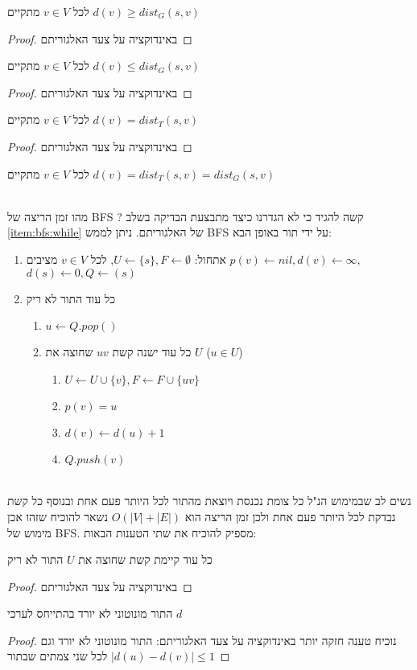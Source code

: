 \begin{claim}
לכל
$v \in V$
מתקיים
$d(v) \geq dist_G(s, v)$
\end{claim}
\begin{proof}
באינדוקציה על צעד האלגוריתם
\end{proof}

\begin{claim}
לכל
$v \in V$
מתקיים
$d(v) \leq dist_G(s,v)$
\end{claim}
\begin{proof}
באינדוקציה על צעד האלגוריתם
\end{proof}

\begin{claim}
לכל
$v \in V$
מתקיים
$d(v) = dist_T(s,v)$
\end{claim}
\begin{proof}
באינדוקציה על צעד האלגוריתם
\end{proof}


\begin{theorem}
לכל
$v \in V$
מתקיים
$d(v) = dist_T(s,v) = dist_G(s,v)$
\end{theorem}
\\
\noindent
מהו זמן הריצה של BFS ? קשה להגיד כי לא הגדרנו כיצד מתבצעת הבדיקה בשלב 
\ref{item:bfs:while}
של האלגוריתם. 
ניתן לממש BFS על ידי תור באופן הבא:
\begin{enumerate}
\item
אתחול:
$U \leftarrow \{s\}, F \leftarrow \emptyset$, 
לכל 
$v \in V$
מציבים
$p(v) \leftarrow nil, d(v) \leftarrow \infty$,
$d(s) \leftarrow 0, Q \leftarrow (s)$
\item 
כל עוד התור לא ריק 
\begin{enumerate}
	\item
	$u \leftarrow Q.pop()$
\item
כל עוד ישנה קשת 
$uv$
שחוצה את $U$
($u \in U$)
		\begin{enumerate}
		\item
		$U \leftarrow U \cup \{v\}, F \leftarrow F \cup \{uv\}$
		\item
		$p(v) = u$
		\item
		$d(v) \leftarrow d(u) + 1$
		\item
		$Q.push(v)$
		\end{enumerate}
	\end{enumerate}
\end{enumerate}
\\
\noindent
נשים לב שבמימוש הנ"ל כל צומת נכנסת ויוצאת מהתור לכל היותר פעם אחת 
ובנוסף כל קשת נבדקת לכל היותר פעם אחת ולכן זמן הריצה הוא 
$O(|V| + |E|)$
נשאר להוכיח שזהו אכן מימוש של BFS.
מספיק להוכיח את שתי הטענות הבאות:
\begin{claim}
כל עוד קיימת קשת שחוצה את $U$ התור לא ריק
\end{claim}
\begin{proof}
באינדוקציה על צעד האלגוריתם
\end{proof}

\begin{claim}
התור מונוטוני לא יורד בהתייחס לערכי 
$d$
\end{claim}
\begin{proof}
נוכיח טענה חזקה יותר באינדוקציה על צעד האלגוריתם: 
התור מונוטוני לא יורד וגם 
$|d(u) - d(v)| \leq 1$
לכל שני צמתים שבתור
\end{proof}
